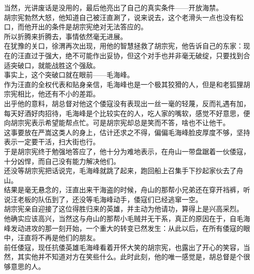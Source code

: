 \begin{multicols}{\theparacolNo}
当然，光讲废话是没用的，最后他亮出了自己的真实条件——开放海禁。\\

胡宗宪勃然大怒，他知道自己被汪直涮了，说来说去，这个老滑头一点也没有松口，而他开出的条件是胡宗宪绝对无法答应的。\\

所以折腾来折腾去，事情依然毫无进展。\\

在犹豫的关口，徐渭再次出现，用他的智慧拯救了胡宗宪，他告诉自己的东家：现在的汪直过于强大，绝不可能作出妥协，但这个对手也并非毫无破绽，只要找到合适突破口，就能战胜这个强敌。\\

事实上，这个突破口就在眼前——毛海峰。\\

作为汪直的全权代表和贴身亲信，毛海峰也是一个极其狡猾的人，但是和老狐狸胡宗宪相比，他还有不小的差距。\\

出乎他的意料，胡总督对他这个倭寇没有表现出一丝一毫的轻蔑，反而礼遇有加，每天好酒好肉招待，毛海峰是个比较实在的人，吃人家的嘴软，感觉不好意思，便向胡宗宪表示希望能帮点忙。可是胡宗宪却总是笑而不答，啥也不让他干。\\

这事要放在严嵩这类人的身上，估计还求之不得，偏偏毛海峰脸皮厚度不够，坚持表示一定要干活，扫大街也行。\\

于是胡宗宪终于勉强地答应了，他十分为难地表示，在舟山一带盘踞着一伙倭寇，十分凶悍，而自己没有能力解决他们。\\

还没等胡宗宪把话说完，毛海峰就跳了起来，跑回船上召集手下抄起家伙去了舟山。\\

结果是毫无悬念的，汪直出来干海盗的时候，舟山的那帮小兄弟还在穿开裆裤，听说汪老板的队伍到了，还没等毛海峰动手，倭寇们已经逃窜一空。\\

胡宗宪亲自迎接了这位得胜归来的英雄，并主动为他请功，算得上是兴高采烈。\\

他确实应该高兴，当然这与舟山的那帮小毛贼并无干系，真正的原因在于，自毛海峰发动进攻的那一刻开始，一个重大的转变已然发生：从此以后，在所有倭寇的眼中，汪直将不再是他们的朋友。\\

前任倭寇，现任抗倭英雄毛海峰看着开怀大笑的胡宗宪，也露出了开心的笑容，当然，其实他并不知道对方在笑些什么。此时此刻，他的唯一感觉是，胡总督是个很够意思的人。\\


\end{multicols}
